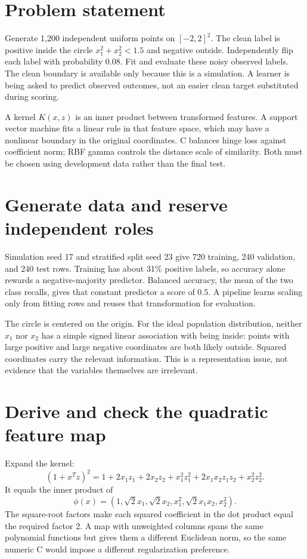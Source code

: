 

\section*{Problem statement}
Generate 1,200 independent uniform points on $[-2,2]^2$. The clean label is positive inside the circle
$x_1^2+x_2^2<1.5$ and negative outside. Independently flip each label with probability 0.08.
Fit and evaluate these noisy observed labels. The clean boundary is available only because this is a simulation.
A learner is being asked to predict observed outcomes, not an easier clean target substituted during scoring.

A kernel $K(x,z)$ is an inner product between transformed features. A support vector machine fits a linear
rule in that feature space, which may have a nonlinear boundary in the original coordinates.
C balances hinge loss against coefficient norm; RBF gamma controls the distance scale of similarity.
Both must be chosen using development data rather than the final test.

\section{Generate data and reserve independent roles}
Simulation seed 17 and stratified split seed 23 give 720 training, 240 validation, and 240 test rows.
Training has about 31\% positive labels, so accuracy alone rewards a negative-majority predictor.
Balanced accuracy, the mean of the two class recalls, gives that constant predictor a score of 0.5.
A pipeline learns scaling only from fitting rows and reuses that transformation for evaluation.

The circle is centered on the origin. For the ideal population distribution, neither $x_1$ nor $x_2$ has
a simple signed linear association with being inside: points with large positive and large negative coordinates
are both likely outside. Squared coordinates carry the relevant information. This is a representation issue,
not evidence that the variables themselves are irrelevant.

\section{Derive and check the quadratic feature map}
Expand the kernel:
\[
(1+x^Tz)^2=1+2x_1z_1+2x_2z_2+x_1^2z_1^2+2x_1x_2z_1z_2+x_2^2z_2^2.
\]
It equals the inner product of
\[\phi(x)=(1,\sqrt2x_1,\sqrt2x_2,x_1^2,\sqrt2x_1x_2,x_2^2).\]
The square-root factors make each squared coefficient in the dot product equal the required factor 2.
A map with unweighted columns spans the same polynomial functions but gives them a different Euclidean norm,
so the same numeric C would impose a different regularization preference.

